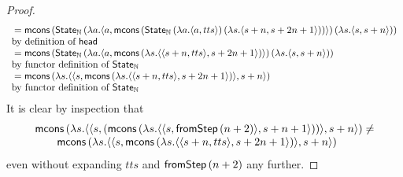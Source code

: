 \begin{proof}
$$\begin{array}{ll}
{}=  \mathsf{mcons}\, (\mathsf{State}_{\mathbb{N}}\,(\lambda a . \langle a,   
\mathsf{mcons}\, (\mathsf{State}_{\mathbb{N}} \,(\lambda a . \langle a, tts \rangle)\, (\lambda s . \langle s + n, s + 2n + 1 \rangle))
 \rangle)\, (\lambda s. \langle s, s + n \rangle))
\\ \mbox{by definition of } \mathsf{head} \\
{}= \mathsf{mcons}\, (\mathsf{State}_{\mathbb{N}}\,(\lambda a . \langle a,   
\mathsf{mcons}\, (\lambda s . \langle \langle s + n, tts \rangle, s + 2n + 1 \rangle)
 \rangle)\, (\lambda s. \langle s, s + n \rangle)) \\
\mbox{by functor definition of } \mathsf{State}_{\mathbb{N}}  \\
{}= \mathsf{mcons}\, (\lambda s. \langle \langle s, \mathsf{mcons}\, (\lambda s . \langle \langle s + n, tts \rangle, s + 2n + 1 \rangle) \rangle, s + n \rangle) \\ 
\mbox{by functor definition of } \mathsf{State}_{\mathbb{N}}  \\
\end{array} 
$$
It is clear by inspection that 
$$
\begin{array}{l}
\mathsf{mcons}\, (\lambda s. \langle \langle s, (\mathsf{mcons}\, (\lambda s. \langle \langle s, \mathsf{fromStep}\, (n + 2) \rangle, s + n + 1 \rangle)) \rangle, s + n \rangle) \neq \\
\qquad \mathsf{mcons}\, (\lambda s. \langle \langle s, \mathsf{mcons}\, (\lambda s . \langle \langle s + n, tts \rangle, s + 2n + 1 \rangle) \rangle, s + n \rangle)
\end{array} 
$$
even without expanding $tts$ and $\mathsf{fromStep}\, (n + 2)$ any further.
\end{proof}




